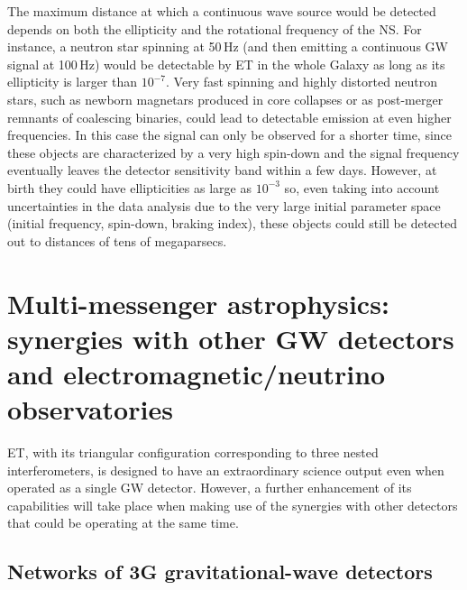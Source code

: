 The maximum distance at which a continuous wave source would be detected
depends on both the ellipticity and the rotational frequency of the NS. For instance,  a neutron star spinning  at 50\,Hz (and then emitting a continuous GW signal at 100\,Hz) would be detectable by ET  in the whole Galaxy as long as its ellipticity is larger than $10^{-7}$. 
Very  fast spinning  and highly distorted neutron stars,  such as newborn magnetars produced in core collapses or as post-merger remnants of coalescing binaries, could lead to detectable emission at even higher frequencies. In this case the signal can only be observed for a shorter time, since these objects  
are characterized by a very high spin-down and the signal frequency eventually leaves   the detector sensitivity band within a  few days. However, at birth they could have ellipticities as large as $10^{-3}$ so,  even taking into account uncertainties in the data analysis due to the very large initial parameter space (initial frequency, spin-down, braking index), these objects could still be detected out to distances of  tens of megaparsecs.
 

\section{Multi-messenger astrophysics: synergies with other GW detectors and electromagnetic/neutrino observatories}
\label{sec:MM}


ET, with its triangular configuration corresponding to three nested interferometers, is designed to have an extraordinary science output even when operated as a single GW detector. However, a further enhancement of its capabilities will take place when making use of  the synergies with other detectors that could be operating at the same time.

\subsection{Networks of 3G gravitational-wave detectors}

